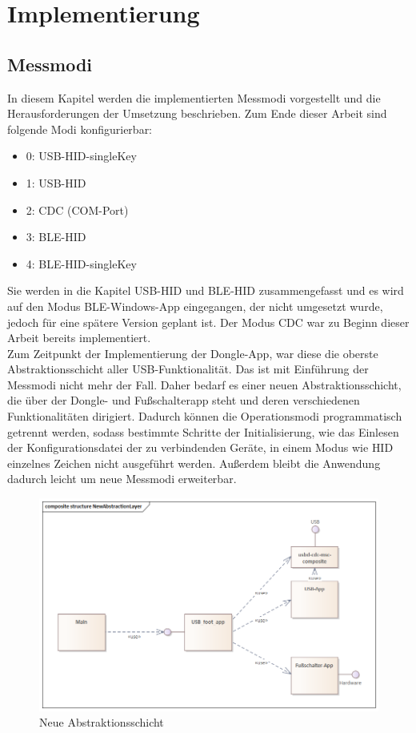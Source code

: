 \section{Implementierung}
\label{Implementierung}

\subsection{Messmodi}
\label{Messmodi}
In diesem Kapitel werden die implementierten Messmodi vorgestellt und die Herausforderungen der Umsetzung beschrieben. Zum Ende dieser Arbeit sind folgende Modi konfigurierbar:
\begin{itemize}
	\item 0: \ac{USB}-\ac{HID}-singleKey
	\item 1: \ac{USB}-\ac{HID}
	\item 2: \ac{CDC} (COM-Port)
	\item 3: \ac{BLE}-\ac{HID}
	\item 4: \ac{BLE}-\ac{HID}-singleKey
\end{itemize}
Sie werden in die Kapitel \ac{USB}-\ac{HID} und \ac{BLE}-\ac{HID} zusammengefasst und es wird auf den Modus \ac{BLE}-Windows-App eingegangen, der nicht umgesetzt wurde, jedoch für eine spätere Version geplant ist. Der Modus \ac{CDC} war zu Beginn dieser Arbeit bereits implementiert. \\
Zum Zeitpunkt der Implementierung der Dongle-App, war diese die oberste Abstraktionsschicht aller USB-Funktionalität. Das ist mit Einführung der Messmodi nicht mehr der Fall. Daher bedarf es einer neuen Abstraktionsschicht, die über der Dongle- und Fußschalterapp steht und deren verschiedenen Funktionalitäten dirigiert. Dadurch können die Operationsmodi programmatisch getrennt werden, sodass bestimmte Schritte der Initialisierung, wie das Einlesen der Konfigurationsdatei der zu verbindenden Geräte, in einem Modus wie \ac{HID} einzelnes Zeichen nicht ausgeführt werden. Außerdem bleibt die Anwendung dadurch leicht um neue Messmodi erweiterbar. 

\begin{figure}[H] 
	\centering
	\includegraphics[width=\textwidth]{figures/NewAbstractionLayer.png}
	\caption{Neue Abstraktionsschicht}
	\label{fig:NeueAbstraktionsschicht}
\end{figure}


